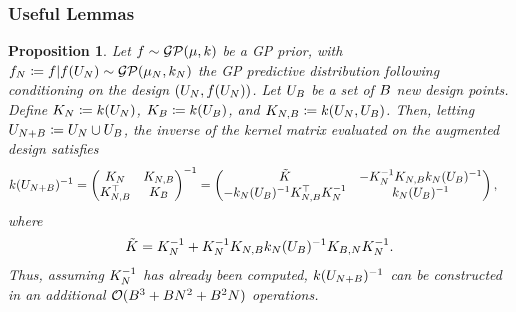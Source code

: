 \documentclass[12pt]{article}
\newtheorem{prop}{Proposition}
\begin{document}
\subsubsection{Useful Lemmas}

\begin{prop} \label{partitioned-matrix-inverse}
Let $\func \sim \GP(\gpMeanPrior, \gpKerPrior)$ be a GP prior, with 
$\funcEm[\Ndesign] \Def \func | \func(\designIn) \sim \GP(\gpMean[\Ndesign], \gpKer[\Ndesign])$ the 
GP predictive distribution following conditioning on the design $(\designIn, \func(\designIn))$. Let 
$\designBatchIn$ be a set of $\Nbatch$ new design points. Define 
$\kerMat[\Ndesign] \Def \gpKerPrior(\designIn)$, $\kerMat[\Nbatch] \Def \gpKerPrior(\designBatchIn)$,
and $\kerMat[\Ndesign,\Nbatch] \Def \gpKerPrior(\designIn[\Ndesign], \designBatchIn)$.  
Then, letting 
$\designIn[\Naugment] \Def \designIn \cup \designBatchIn$, the inverse of the kernel matrix 
evaluated on the augmented design satisfies 
\begin{align}
\gpKerPrior(\designIn[\Naugment])^{-1}
&= \begin{pmatrix} \kerMat[\Ndesign] & \kerMat[\Ndesign,\Nbatch] \\
\kerMat[\Ndesign,\Nbatch]^\top & \kerMat[\Nbatch] \end{pmatrix}^{-1}
=  \begin{pmatrix} \tilde{K} & -\kerMat[\Ndesign]^{-1} \kerMat[\Ndesign,\Nbatch] \gpKer[\Ndesign](\designBatchIn)^{-1} \\
-\gpKer[\Ndesign](\designBatchIn)^{-1} \kerMat[\Ndesign,\Nbatch]^\top  \kerMat[\Ndesign]^{-1} & \gpKer[\Ndesign](\designBatchIn)^{-1} \end{pmatrix},
\end{align}
where 
\begin{align}
\tilde{K} = \kerMat[\Ndesign]^{-1} + \kerMat[\Ndesign]^{-1} \kerMat[\Ndesign,\Nbatch] \gpKer[\Ndesign](\designBatchIn)^{-1} \kerMat[\Nbatch,\Ndesign] \kerMat[\Ndesign]^{-1}.
\end{align}
Thus, assuming $\kerMat[\Ndesign]^{-1}$ has already been computed, $\gpKerPrior(\designIn[\Naugment])^{-1}$ can be constructed in an additional 
$\BigO(\Nbatch^3 + \Nbatch \Ndesign^2 + \Nbatch^2 \Ndesign)$ operations. 
\end{prop}
\end{document}
